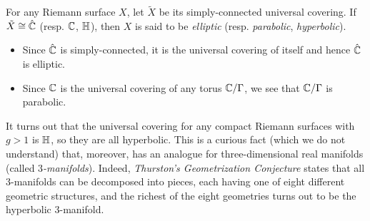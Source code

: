 \documentclass[../Moduli_Spaces_of_Riemann_Surfaces.tex]{subfiles}
\begin{document}
    \begin{remark}
        For any Riemann surface $X$, let $\tilde{X}$ be its simply-connected universal covering. If $\tilde{X}\cong\hat{\mathbb{C}}$ (resp. $\mathbb{C}$, $\mathbb{H}$), then $X$ is said to be \textit{elliptic} (resp. \textit{parabolic}, \textit{hyperbolic}).
        \begin{itemize}
            \item Since $\hat{\mathbb{C}}$ is simply-connected, it is the universal covering of itself and hence $\hat{\mathbb{C}}$ is elliptic.
                \vspace{-0.05in}
            \item Since $\mathbb{C}$ is the universal covering of any torus $\mathbb{C}/\Gamma$, we see that $\mathbb{C}/\Gamma$ is parabolic.
        \end{itemize}
        It turns out that the universal covering for any compact Riemann surfaces with $g>1$ is $\mathbb{H}$, so they are all hyperbolic. This is a curious fact (which we do not understand) that, moreover, has an analogue for three-dimensional real manifolds (called \textit{$3$-manifolds}). Indeed, \textit{Thurston's Geometrization Conjecture} states that all $3$-manifolds can be decomposed into pieces, each having one of eight different geometric structures, and the richest of the eight geometries turns out to be the hyperbolic $3$-manifold.\exqed
    \end{remark}
\end{document}
